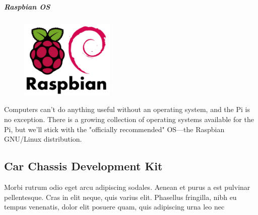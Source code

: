 \subparagraph*{Raspbian OS}

\begin{figure}
\vspace{-25pt}
  \begin{center}
    \includegraphics[width=0.4\textwidth]{./Pictures/raspbian.png}
  \end{center}
\end{figure}
\hfill \break
Computers can't do anything useful without an operating system, and the Pi is
no exception. There is a growing collection of operating systems available for
the Pi, but we'll stick with the "officially recommended" OS—the Raspbian
GNU/Linux distribution.
\clearpage

\subsection{Car Chassis Development Kit}

Morbi rutrum odio eget arcu adipiscing sodales. Aenean et purus a est pulvinar pellentesque. Cras in elit neque, quis varius elit. Phasellus fringilla, nibh eu tempus venenatis, dolor elit posuere quam, quis adipiscing urna leo nec 

